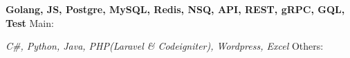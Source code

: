 \begin{cventries}

    
\cventry
    {\textbf{Golang, JS, Postgre, MySQL, Redis, NSQ, API, REST, gRPC, GQL, Test} }
    {Main:}
    {}
    {}
    {
        \iffalse
        \begin{cvitems}
            \item Languages: Go, PHP, C\#, HTML/CSS, Javascript. 
            \item MySQL, ASP.Net, Postman, Apache Tomcat, Linux.
            \item Web services, REST APIs, Auths, SQL, Unit testing.
        \end{cvitems}
        \fi
    }


\cventry
    {\textit{C\#, Python, Java, PHP(Laravel \& Codeigniter), Wordpress, Excel} }
    {Others:}
    {}
    {}
    {
        \iffalse
        \begin{cvitems}
            \item Nodejs/expressjs, Java, Python, Laravel, Wordpress, Jekyll.
        \end{cvitems}
        \fi
    }
\end{cventries}
